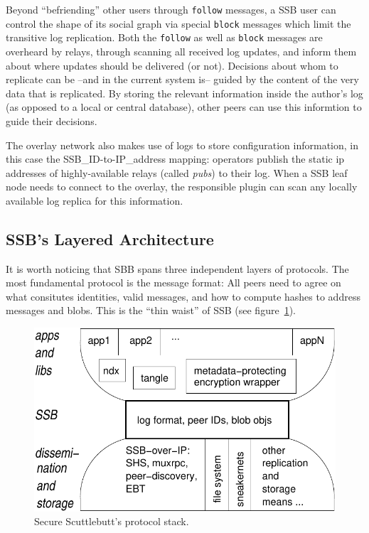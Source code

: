 \documentclass[9pt,sigconf,rewiew]{acmart}
\begin{document}
Beyond ``befriending'' other users through {\tt follow} messages, a SSB user can control the shape of its social graph via special {\tt block} messages which limit the transitive log replication. Both the {\tt follow} as well as {\tt block} messages are overheard by relays, through scanning all received log updates, and inform them about where updates should be delivered (or not). Decisions about whom to replicate can be --and in the current system is-- guided by the content of the very data that is replicated. By storing the relevant information inside the author's log (as opposed to a local or central database), other peers can use this informtion to guide their decisions.

The overlay network also makes use of logs to store configuration information, in this case the SSB\_ID-to-IP\_address mapping: operators publish the static ip addresses of highly-available relays (called {\em pubs}) to their log. When a SSB leaf node needs to connect to the overlay, the responsible plugin can scan any locally available log replica for this information.

\subsection*{SSB's Layered Architecture}

It is worth noticing that SBB spans three independent layers of protocols. The most fundamental protocol is the message format: All peers need to agree on what consitutes identities, valid messages, and how to compute hashes to address messages and blobs. This is the ``thin waist'' of SSB (see figure~\ref{fig:waist}).

\begin{figure}[htb]
  \includegraphics[width=0.9\columnwidth]{figs/ssb-waist.pdf}
  \caption{Secure Scuttlebutt's protocol stack.}
  \label{fig:waist}
\end{figure}
\end{document}
